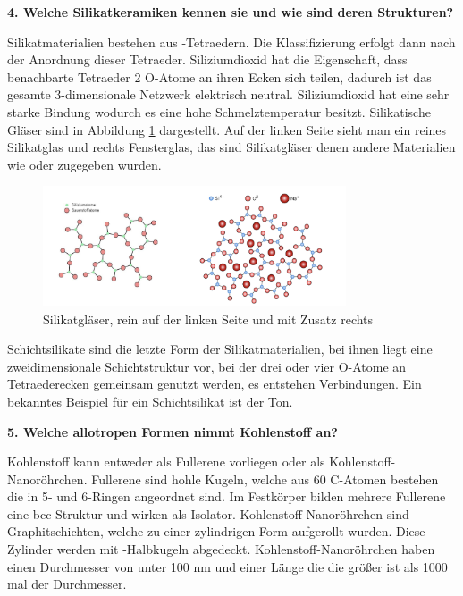 \noindent\textbf{4. Welche Silikatkeramiken kennen sie und wie sind deren Strukturen?}\\
\begin{addmargin}[25pt]{0pt}
Silikatmaterialien bestehen aus -Tetraedern. Die Klassifizierung erfolgt dann nach der Anordnung dieser Tetraeder. Siliziumdioxid hat die Eigenschaft, dass benachbarte Tetraeder 2 O-Atome an ihren Ecken sich teilen, dadurch ist das gesamte 3-dimensionale Netzwerk elektrisch neutral. Siliziumdioxid hat eine sehr starke Bindung wodurch es eine hohe Schmelztemperatur besitzt. Silikatische Gläser sind in Abbildung \ref{fig:Silikatgläser} dargestellt. Auf der linken Seite sieht man ein reines Silikatglas und rechts Fensterglas, das sind Silikatgläser denen andere Materialien wie  oder  zugegeben wurden.
\begin{figure}[h]
    \centering
    \includegraphics[width = 0.8\textwidth]{images/Materialwissenschaften/Silikatische_glaser.jpeg}
    \caption{Silikatgläser, rein auf der linken Seite und mit Zusatz rechts}
    \label{fig:Silikatgläser}
\end{figure}
Schichtsilikate sind die letzte Form der Silikatmaterialien, bei ihnen liegt eine zweidimensionale Schichtstruktur vor, bei der drei oder vier O-Atome an Tetraederecken gemeinsam genutzt werden, es entstehen  Verbindungen. Ein bekanntes Beispiel für ein Schichtsilikat ist der Ton.\\
\end{addmargin}

\noindent\textbf{5. Welche allotropen Formen nimmt Kohlenstoff an?}\\
\begin{addmargin}[25pt]{0pt}
Kohlenstoff kann entweder als Fullerene  vorliegen oder als Kohlenstoff-Nanoröhrchen. Fullerene sind hohle Kugeln, welche aus 60 C-Atomen bestehen die in 5- und 6-Ringen angeordnet sind. Im Festkörper bilden mehrere Fullerene eine bcc-Struktur und wirken als Isolator. Kohlenstoff-Nanoröhrchen sind Graphitschichten, welche zu einer zylindrigen Form aufgerollt wurden. Diese Zylinder werden mit -Halbkugeln abgedeckt. Kohlenstoff-Nanoröhrchen haben einen Durchmesser von unter 100 nm  und einer Länge die die größer ist als 1000 mal der Durchmesser.\\
\end{addmargin}


